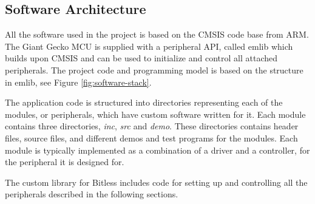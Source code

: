 
\subsection{Software Architecture}

All the software used in the project is based on the CMSIS \cite{cmsisapi} code
base from ARM. The Giant Gecko MCU is supplied with a peripheral API, called
emlib \cite{emlibapi} which builds upon CMSIS and can be used to initialize and
control all attached peripherals. The project code and programming model is
based on the structure in emlib, see Figure \ref{fig:software-stack}.



The application code is structured into directories representing each of the
modules, or peripherals, which have custom software written for it. Each module
contains three directories, \textit{inc}, \textit{src} and \textit{demo}.
These directories contains header files, source files, and different demos and
test programs for the modules. Each module is typically implemented as a
combination of a driver and a controller, for the peripheral it is designed for.

The custom library for Bitless includes code for setting up and controlling
all the peripherals described in the following sections.
